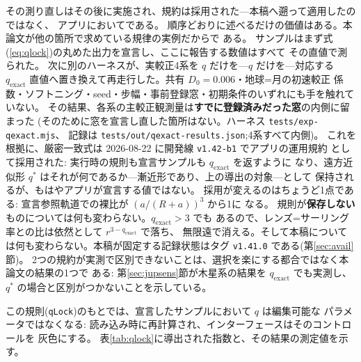 \documentclass[a4paper,10pt,twocolumn]{ltjsarticle}
\begin{document}
その測り直しはその後に実施され、規約は採用された---本稿へ遡って適用したのではなく、
アプリにおいてである。
順序どおりに述べるだけの価値はある。本論文が他の箇所で求めている規律の実例だからで
ある。
サンプルはまず式(\ref{eq:qlock})の丸めた出力を宣言し、ここに報告する数値はすべて
その直値で測られた。
次に別のハーネスが、実較正4系を $q$ だけを---$q$ だけを---対応する
$q_{\mathrm{exact}}$ 直値へ置き換えて再走行した。共有 $D_0=0.006$・地球=月の初速較正
係数・ソフトニング・seed・步幅・事前登録窓・初期条件のいずれにも手を触れていない。
その結果、各系の主較正観測量は\textbf{すでに登録済みだった窓}の内側に留まった
(そのために窓を宣言し直した箇所はない。ハーネス \texttt{tests/exp-qexact.mjs}、
記録は \texttt{tests/out/qexact-results.json};4系すべて内側)。
これを根拠に、厳密一致式は 2026-08-22 に開発線 \texttt{v1.42-b1} でアプリの運用規約
として採用された: 実行時の規則も宣言サンプルも $q_{\mathrm{exact}}$ を返すように
なり、遠方近似形 $q^{*}$ はそれが何であるか---漸近形であり、上の導出の対象---として
保持されるが、もはやアプリが宣言する値ではない。
採用が変えるのはちょうど1点である: 宣言参照軌道での裸比が $(a/(R+a))^{3}$ から1に
なる。
規則が\textbf{保存しない}ものについては何も変わらない。$q_{\mathrm{exact}}>3$ でも
あるので、レンズ=サーリング率との比は依然として $r^{3-q_{\mathrm{exact}}}$ で落ち、
無限遠で消える。そして本稿については何も変わらない。本稿が固定する記録状態はタグ
\texttt{v1.41.0} である(第\ref{sec:avail}節)。
2つの規約が実測で区別できないことは、選択を楽にする都合ではなく本論文の結果の1つで
ある: 第\ref{sec:jupsens}節が木星系の結果を $q_{\mathrm{exact}}$ でも実測し、
$q^{*}$ の場合と区別がつかないことを示している。

この規則(\texttt{qLock})のもとでは、宣言したサンプルにおいて $q$ は編集可能な
パラメータではなくなる: 読み込み時に再計算され、インターフェースはそのコントロールを
灰色にする。
表\ref{tab:qlock}に導出された指数と、その結果の測定値を示す。
\end{document}
